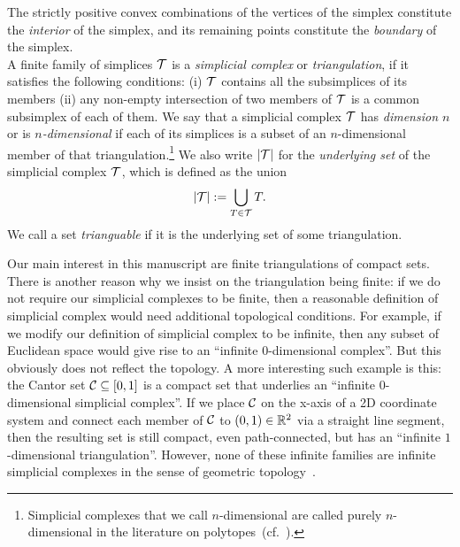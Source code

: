 \documentclass[10pt,letterpaper]{article}
\begin{document}
The strictly positive convex combinations of the vertices of the simplex constitute the \textit{ interior} of the simplex,
and its remaining points constitute the \textit{boundary} of the simplex.
\\

A finite family of simplices ${\mathcal T}$ is a \emph{simplicial complex} or \emph{triangulation}, if it satisfies the following conditions: 
(i) ${\mathcal T}$ contains all the subsimplices of its members (ii) any non-empty intersection of two members of ${\mathcal T}$ is a common subsimplex of each of them. 
We say that a simplicial complex ${\mathcal T}$ has \textit{dimension $n$} or is \textit{$n$-dimensional} if each of its simplices is a subset of an $n$-dimensional member of that triangulation.\footnote{Simplicial complexes that we call $n$-dimensional are called purely $n$-dimensional in the literature on polytopes~(cf.\ \cite{ziegler2012lectures}).} 
We also write $\left| {\mathcal T} \right|$ for the \textit{underlying set} of the simplicial complex ${\mathcal T}$, which is defined as the union 
\begin{align*}
    \left| {\mathcal T} \right| := \bigcup_{ T \in {\mathcal T} } T
    .
\end{align*}
We call a set \textit{trianguable} if it is the underlying set of some triangulation. 


\begin{remark}
    Our main interest in this manuscript are finite triangulations of compact sets. 
    There is another reason why we insist on the triangulation being finite: 
    if we do not require our simplicial complexes to be finite,
    then a reasonable definition of simplicial complex would need additional topological conditions. 
    For example, if we modify our definition of simplicial complex to be infinite, 
    then any subset of Euclidean space would give rise to an ``infinite $0$-dimensional complex''. But this obviously does not reflect the topology. 
    A more interesting such example is this:
    the Cantor set ${\mathcal C} \subseteq [0,1]$ is a compact set 
    that underlies an ``infinite $0$-dimensional simplicial complex''.
    If we place ${\mathcal C}$ on the x-axis of a 2D coordinate system 
    and connect each member of ${\mathcal C}$ to $(0,1) \in {\mathbb R}^{2}$ via a straight line segment, 
    then the resulting set is still compact, even path-connected,  
    but has an ``infinite $1$-dimensional triangulation''.
    However, none of these infinite families are infinite simplicial complexes in the sense of geometric topology~\cite{lee2011topological}. 
\end{remark}
\end{document}
